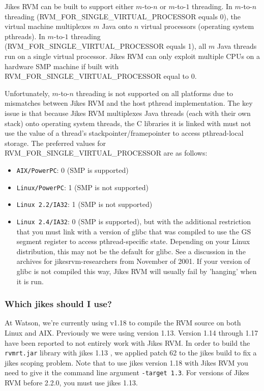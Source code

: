 Jikes RVM can be built to support either $m$-to-$n$ or $m$-to-$1$
threading.  In $m$-to-$n$ threading
(RVM\_FOR\_SINGLE\_VIRTUAL\_PROCESSOR equals 0), the virtual machine
multiplexes $m$ Java 
onto $n$ virtual processors (operating system pthreads).
In $m$-to-$1$ threading (RVM\_FOR\_SINGLE\_VIRTUAL\_PROCESSOR equals 1),
all $m$ Java threads run on a single virtual processor.  Jikes RVM 
can only exploit multiple CPUs on a hardware SMP machine if 
built with RVM\_FOR\_SINGLE\_VIRTUAL\_PROCESSOR equal to 0.

Unfortunately, $m$-to-$n$ threading is not supported on all platforms due to
mismatches between Jikes RVM  and the host pthread implementation.  
The key issue is that because Jikes RVM multiplexes Java threads
(each with their own stack) onto operating system threads, the
C libraries it is linked with must not use the value of a thread's
stackpointer/framepointer to access pthread-local storage.  The
preferred values for RVM\_FOR\_SINGLE\_VIRTUAL\_PROCESSOR are as
follows: 
\begin{itemize}
\item {\tt AIX/PowerPC}: 0 (SMP is supported)
\item {\tt Linux/PowerPC}:  1 (SMP is not supported)
\item {\tt Linux 2.2/IA32}: 1 (SMP is not supported)
\item {\tt Linux 2.4/IA32}: 0 (SMP is supported), but with the
additional restriction that you must link with a version of glibc that
was compiled to use the GS segment register to access pthread-specific
state.  Depending on your Linux distribution, this may not be the
default for glibc. See a discussion in the archives for
jikesrvm-researchers from November of 2001. If your version of glibc
is not compiled this way, Jikes RVM  will usually fail by 'hanging' when
it is run.
\end{itemize}                

\subsubsection{Which jikes should I use?}
At Watson, we're currently using  v1.18
to compile the RVM source on both Linux and
AIX\AIXTMFootnote. Previously we were using version 1.13. Version 1.14
through 1.17 have been reported to not entirely work with Jikes
RVM. In order to build the {\tt rvmrt.jar} library with jikes 1.13 ,
we applied patch 62 to the jikes build to fix a jikes scoping
problem.  Note that to use jikes version 1.18 with Jikes RVM you need
to give it the command line argument {\tt -target 1.3}. For versions
of Jikes RVM before 2.2.0, you must use jikes 1.13.

